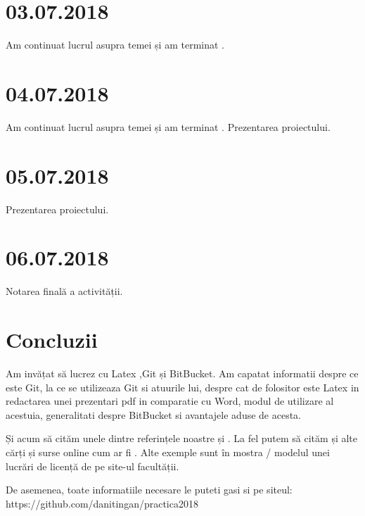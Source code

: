 \documentclass{report}
\begin{document}
\chapter{03.07.2018}
Am continuat lucrul asupra temei și am terminat .
\chapter{04.07.2018}
Am continuat lucrul asupra temei și am terminat .
Prezentarea proiectului.
\chapter{05.07.2018}
Prezentarea proiectului.
\chapter{06.07.2018}

Notarea finală a activității.

\chapter{Concluzii}
Am invățat să lucrez cu Latex ,Git și BitBucket.
Am capatat informatii despre ce este Git, la ce se utilizeaza Git si atuurile lui, despre cat de folositor este Latex in redactarea unei prezentari pdf in comparatie cu Word, modul de utilizare al acestuia, generalitati despre BitBucket si avantajele aduse de acesta.

Și acum să cităm unele dintre referințele noastre \cite{lamport1994latex} și \cite{loeliger2012version}. La fel putem să cităm și alte cărți și surse online cum ar fi \cite{cederman2008practical, cederman2009gpu}. Alte exemple sunt în mostra / modelul unei lucrări de licență de pe site-ul facultății. 

De asemenea, toate informatiile necesare le puteti gasi si pe siteul:
https://github.com/danitingan/practica2018


 

\end{document}
